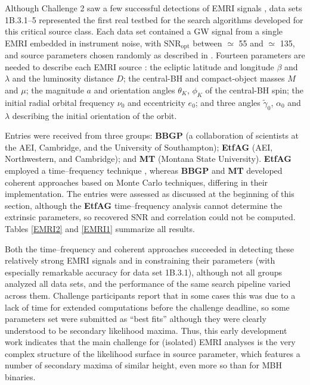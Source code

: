 \documentclass{iopart}
\begin{document}
Although Challenge 2 saw a few successful detections of EMRI signals \cite{mldcamaldi2}, data sets 1B.3.1--5 represented the first real testbed for the search algorithms developed for this critical source class. Each data set contained a GW signal from a single EMRI embedded in instrument noise, with $\mathrm{SNR}_\mathrm{opt}$ between $\simeq$ 55 and $\simeq$ 135, and source parameters chosen randomly as described in \cite{mldcgwdaw2}. Fourteen parameters are needed to describe each EMRI source \cite{mldcgwdaw2}: 
the ecliptic latitude and longitude $\beta$ and $\lambda$ and the luminosity distance $D$; the central-BH and compact-object masses $M$ and $\mu$;  the magnitude $a$ and orientation angles $\theta_K$, $\phi_K$ of the central-BH spin; the initial radial orbital frequency $\nu_0$ and eccentricity $e_0$; and three angles $\tilde{\gamma}_0$, $\alpha_0$ and $\lambda$ describing the initial orientation of the orbit.

Entries were received from three groups: \textbf{BBGP} (a collaboration of scientists at the AEI, Cambridge, and the University of Southampton); \textbf{EtfAG} (AEI, Northwestern, and Cambridge); and \textbf{MT} (Montana State University).
\textbf{EtfAG} employed a time--frequency technique \cite{gmw}, whereas \textbf{BBGP} and \textbf{MT} developed coherent approaches based on Monte Carlo techniques, differing in their implementation.
The entries were assessed as discussed at the beginning of this section, although the \textbf{EtfAG} time--frequency analysis cannot determine the extrinsic parameters, so recovered SNR and correlation could not be computed. Tables \ref{EMRI2} and \ref{EMRI1} summarize all results.

Both the time--frequency and coherent approaches succeeded in detecting these relatively strong EMRI signals and in constraining their parameters (with especially remarkable accuracy for data set 1B.3.1), although not all groups analyzed all data sets, and the performance of the same search pipeline varied across them. Challenge participants report that in some cases this was due to a lack of time for extended computations before the challenge deadline, so some parameters set were submitted as ``best fits'' although they were clearly understood to be secondary likelihood maxima. Thus, this early development work indicates that the main challenge for (isolated) EMRI analyses is the very complex structure of the likelihood surface in source parameter, which features a number of secondary maxima of similar height, even more so than for MBH binaries.
\end{document}

